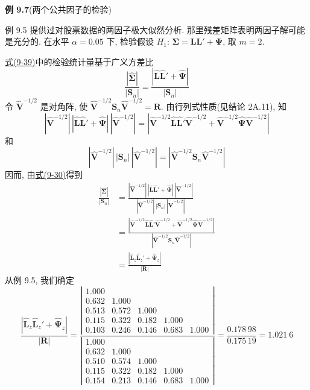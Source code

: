 
\noindent\textbf{例 9.7}\quad (两个公共因子的检验)

例 9.5 提供过对股票数据的两因子极大似然分析. 那里残差矩阵表明两因子解可能是充分的. 在水平 $\alpha=0.05$ 下, 检验假设 $H_1$: $\boldsymbol{\Sigma}=\mathbf{L}\mathbf{L}'+\boldsymbol{\Psi}$, 取 $m=2$.

\hyperref[eq:9-39]{式(9-39)}中的检验统计量基于广义方差比
\[
\frac{|\hat{\boldsymbol{\Sigma}}|}{|\mathbf{S}_n|}=\frac{|\hat{\mathbf{L}}\hat{\mathbf{L}}'+\hat{\boldsymbol{\Psi}}|}{|\mathbf{S}_n|}
\]
令 $\hat{\mathbf{V}}^{-1/2}$ 是对角阵, 使 $\hat{\mathbf{V}}^{-1/2}\mathbf{S}_n\hat{\mathbf{V}}^{-1/2}=\mathbf{R}$. 由行列式性质(见结论 2A.11), 知
\[
|\hat{\mathbf{V}}^{-1/2}|\,|\hat{\mathbf{L}}\hat{\mathbf{L}}'+\hat{\boldsymbol{\Psi}}|\,|\hat{\mathbf{V}}^{-1/2}|=|\hat{\mathbf{V}}^{-1/2}\hat{\mathbf{L}}\hat{\mathbf{L}}'\hat{\mathbf{V}}^{-1/2}+\hat{\mathbf{V}}^{-1/2}\hat{\boldsymbol{\Psi}}\hat{\mathbf{V}}^{-1/2}|
\]
和
\[
|\hat{\mathbf{V}}^{-1/2}|\,|\mathbf{S}_n|\,|\hat{\mathbf{V}}^{-1/2}|=|\hat{\mathbf{V}}^{-1/2}\mathbf{S}_n\hat{\mathbf{V}}^{-1/2}|
\]
因而, 由\hyperref[eq:9-30]{式(9-30)}得到
\label{eq:9-41}
\begin{equation}
\begin{aligned}
\frac{|\hat{\boldsymbol{\Sigma}}|}{|\mathbf{S}_n|}
&=\frac{|\hat{\mathbf{V}}^{-1/2}|\,|\hat{\mathbf{L}}\hat{\mathbf{L}}'+\hat{\boldsymbol{\Psi}}|\,|\hat{\mathbf{V}}^{-1/2}|}{|\hat{\mathbf{V}}^{-1/2}|\,|\mathbf{S}_n|\,|\hat{\mathbf{V}}^{-1/2}|}\\
&=\frac{|\hat{\mathbf{V}}^{-1/2}\hat{\mathbf{L}}\hat{\mathbf{L}}'\hat{\mathbf{V}}^{-1/2}+\hat{\mathbf{V}}^{-1/2}\hat{\boldsymbol{\Psi}}\hat{\mathbf{V}}^{-1/2}|}{|\hat{\mathbf{V}}^{-1/2}\mathbf{S}_n\hat{\mathbf{V}}^{-1/2}|}\\
&=\frac{|\hat{\mathbf{L}}_z\hat{\mathbf{L}}_z'+\hat{\boldsymbol{\Psi}}_z|}{|\mathbf{R}|}
\end{aligned}
\tag{9-41}
\end{equation}
从例 9.5, 我们确定
\[
\frac{|\hat{\mathbf{L}}_z\hat{\mathbf{L}}_z'+\hat{\boldsymbol{\Psi}}_z|}{|\mathbf{R}|}
=\frac{\left|\begin{smallmatrix}1.000& & & & \\0.632&1.000& & & \\0.513&0.572&1.000& & \\0.115&0.322&0.182&1.000& \\0.103&0.246&0.146&0.683&1.000\end{smallmatrix}\right|}
{\left|\begin{smallmatrix}1.000& & & & \\0.632&1.000& & & \\0.510&0.574&1.000& & \\0.115&0.322&0.182&1.000& \\0.154&0.213&0.146&0.683&1.000\end{smallmatrix}\right|}
=\frac{0.178\,98}{0.175\,19}=1.021\ 6
\]

